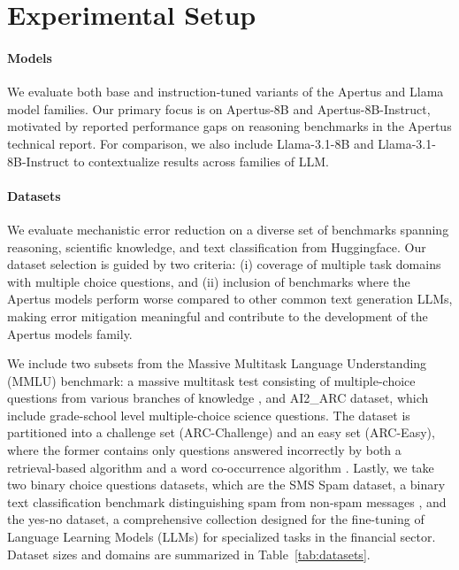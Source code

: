 \documentclass[sigconf]{acmart}
\begin{document}



\section{Experimental Setup}

\paragraph{Models}
We evaluate both base and instruction-tuned variants of the Apertus and Llama model families. Our primary focus is on Apertus-8B and Apertus-8B-Instruct, motivated by reported performance gaps on reasoning benchmarks in the Apertus technical report. For comparison, we also include Llama-3.1-8B and Llama-3.1-8B-Instruct to contextualize results across families of LLM.

\paragraph{Datasets}

We evaluate mechanistic error reduction on a diverse set of benchmarks spanning reasoning, scientific knowledge, and text classification from Huggingface. Our dataset selection is guided by two criteria: (i) coverage of multiple task domains with multiple choice questions, and (ii) inclusion of benchmarks where the Apertus models perform worse compared to other common text generation LLMs, making error mitigation meaningful and contribute to the development of the Apertus models family.

We include two subsets from the Massive Multitask Language Understanding (MMLU) benchmark: a massive multitask test consisting of multiple-choice questions from various branches of knowledge \cite{hendryckstest2021}, and AI2\_ARC dataset, which include grade-school level multiple-choice science questions. The dataset is partitioned into a challenge set (ARC-Challenge) and an easy set (ARC-Easy), where the former contains only questions answered incorrectly by both a retrieval-based algorithm and a word co-occurrence algorithm \cite{allenai:arc}. Lastly, we take two binary choice questions datasets, which are the SMS Spam dataset, a binary text classification benchmark distinguishing spam from non-spam messages \cite{Almeida2011SpamFiltering}, and the yes-no dataset, a comprehensive collection designed for the fine-tuning of Language Learning Models (LLMs) for specialized tasks in the financial sector. Dataset sizes and domains are summarized in Table~\ref{tab:datasets}.
\end{document}
